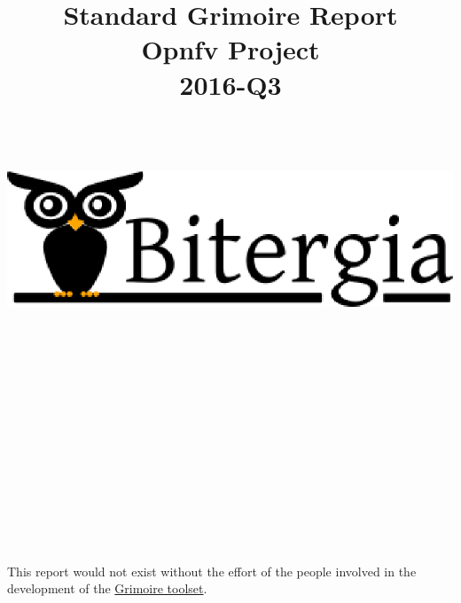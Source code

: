 \documentclass[a4wide,11pt]{report}
\begin{document}
\title{Standard Grimoire Report \\
  Opnfv Project \\
      2016-Q3 \\
        ~~\\~~\\  \includegraphics[scale=.35]{logo}       \\}




\maketitle


\newpage
~~\\~\\~\\~\\


~~\\~~\\

~~\\
~~\\

\begin{tabular}{p{5cm}p{10cm}}

\end{tabular}

~~\\
~~\\

This report would not exist without the effort of the people involved in the development of the \href{http://grimoirelab.github.io}{Grimoire toolset}.

~~\\
~~\\
~~\\
~~\\
~~\\
~~\\
\end{document}
